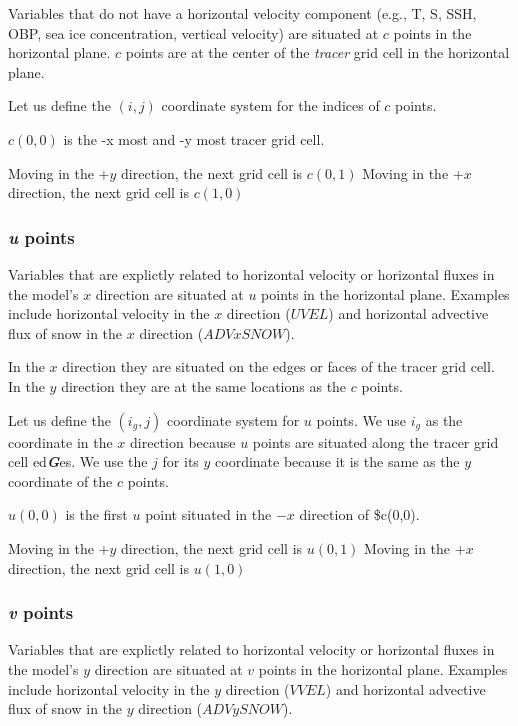 \documentclass[11pt]{article}
\begin{document}
Variables that do not have a horizontal velocity component (e.g., T, S,
SSH, OBP, sea ice concentration, vertical velocity) are situated at
\(c\) points in the horizontal plane. \(c\) points are at the center of
the \emph{tracer} grid cell in the horizontal plane.

Let us define the \((i,j)\) coordinate system for the indices of \(c\)
points.

\(c(0,0)\) is the -x most and -y most tracer grid cell.

Moving in the +\(y\) direction, the next grid cell is \(c(0,1)\) Moving
in the +\(x\) direction, the next grid cell is \(c(1,0)\)

\subsubsection{\texorpdfstring{\emph{u}
points}{u points}}\label{u-points}

Variables that are explictly related to horizontal velocity or
horizontal fluxes in the model's \(x\) direction are situated at \(u\)
points in the horizontal plane. Examples include horizontal velocity in
the \(x\) direction (\(UVEL\)) and horizontal advective flux of snow in
the \(x\) direction (\(ADVxSNOW\)).

In the \(x\) direction they are situated on the edges or faces of the
tracer grid cell. In the \(y\) direction they are at the same locations
as the \(c\) points.

Let us define the \((i_g, j)\) coordinate system for \(u\) points. We
use \(i_g\) as the coordinate in the \(x\) direction because \(u\)
points are situated along the tracer grid cell ed\textbf{\emph{G}}es. We
use the \(j\) for its \(y\) coordinate because it is the same as the
\(y\) coordinate of the \(c\) points.

\(u(0,0)\) is the first \(u\) point situated in the \(-x\) direction of
\$c(0,0).

Moving in the +\(y\) direction, the next grid cell is \(u(0,1)\) Moving
in the +\(x\) direction, the next grid cell is \(u(1,0)\)

\subsubsection{\texorpdfstring{\emph{v}
points}{v points}}\label{v-points}

Variables that are explictly related to horizontal velocity or
horizontal fluxes in the model's \(y\) direction are situated at \(v\)
points in the horizontal plane. Examples include horizontal velocity in
the \(y\) direction (\(VVEL\)) and horizontal advective flux of snow in
the \(y\) direction (\(ADVySNOW\)).
\end{document}
